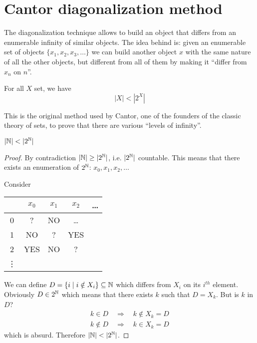 \chapter{Cantor diagonalization method}

The diagonalization technique allows to build an
object that differs from an enumerable infinity of similar objects.
The idea behind is: given an enumerable set of objects
$\{x_1, x_2, x_3, \dots \}$
we can build another object $x$ with the
same nature of all the other objects, but different from all of them
by making it ``differ from $x_n$ on $n$''.

\begin{proposition}
  For all $X$ set, we have
  \[ 
    |X| < |2^X|
  \]
\end{proposition}

This is the original method used by Cantor, one of the founders of the classic theory of sets, to prove that there are
  various ``levels of infinity''.

\begin{corollary}
  $|\mathbb{N}| < |2^{\mathbb{N}}|$
  \begin{proof}
    By contradiction $|\mathbb{N}| \geq |2^{\mathbb{N}}| $, i.e. $|2^{\mathbb{N}}| $ countable. This means that there exists an
    enumeration of $2^{\mathbb{N}}$: $x_0, x_1, x_2, \dots$

    Consider
    \begin{center}
      \begin{tabu}{c | c c c c}
        & $x_0$ & $x_1$ & $x_2$ & \dots \\
         &  ?  & {\tiny NO}  & \dots & \\
        1 &  {\tiny NO}       & ?  & {\tiny YES} & \\
        2 &  {\tiny YES}      & {\tiny NO} & ? & \\
        \vdots & & & &
      \end{tabu}
    \end{center}
    We can define $D = \{i \mid i \notin X_i\} \subseteq \mathbb{N}$ which differs from
    $X_i$ on its $i^{th}$ element. Obviously $D \in 2^{\mathbb{N}} $
    which means that there exists $k$ such that $D = X_k$. But is $k$ in $D$?
    \begin{gather*}
      k \in D \quad \Rightarrow \quad k \notin X_k = D \\
      k \notin D \quad \Rightarrow \quad k \in X_k = D
    \end{gather*}
    which is absurd. Therefore $|\mathbb{N}| < |2^{\mathbb{N}}|$.
  \end{proof}
\end{corollary}

